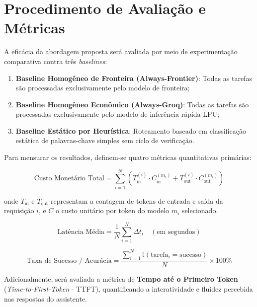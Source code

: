 \section{Procedimento de Avaliação e Métricas}

A eficácia da abordagem proposta será avaliada por meio de experimentação comparativa contra três \textit{baselines}:
\begin{enumerate}
    \item \textbf{Baseline Homogêneo de Fronteira (Always-Frontier)}: Todas as tarefas são processadas exclusivamente pelo modelo de fronteira;
    \item \textbf{Baseline Homogêneo Econômico (Always-Groq)}: Todas as tarefas são processadas exclusivamente pelo modelo de inferência rápida LPU;
    \item \textbf{Baseline Estático por Heurística}: Roteamento baseado em classificação estática de palavras-chave simples sem ciclo de verificação.
\end{enumerate}

Para mensurar os resultados, definem-se quatro métricas quantitativas primárias:

\begin{equation}
    \text{Custo Monetário Total} = \sum_{i=1}^{N} \left( T_{\text{in}}^{(i)} \cdot C_{\text{in}}^{(m_i)} + T_{\text{out}}^{(i)} \cdot C_{\text{out}}^{(m_i)} \right)
\end{equation}

\noindent onde $T_{\text{in}}$ e $T_{\text{out}}$ representam a contagem de tokens de entrada e saída da requisição $i$, e $C$ o custo unitário por token do modelo $m_i$ selecionado.

\begin{equation}
    \text{Latência Média} = \frac{1}{N} \sum_{i=1}^{N} \Delta t_i \quad (\text{em segundos})
\end{equation}

\begin{equation}
    \text{Taxa de Sucesso / Acurácia} = \frac{\sum_{i=1}^{N} \mathbb{I}(\text{tarefa}_i = \text{sucesso})}{N} \times 100\%
\end{equation}

Adicionalmente, será avaliada a métrica de \textbf{Tempo até o Primeiro Token} (\textit{Time-to-First-Token} - TTFT), quantificando a interatividade e fluidez percebida nas respostas do assistente.

